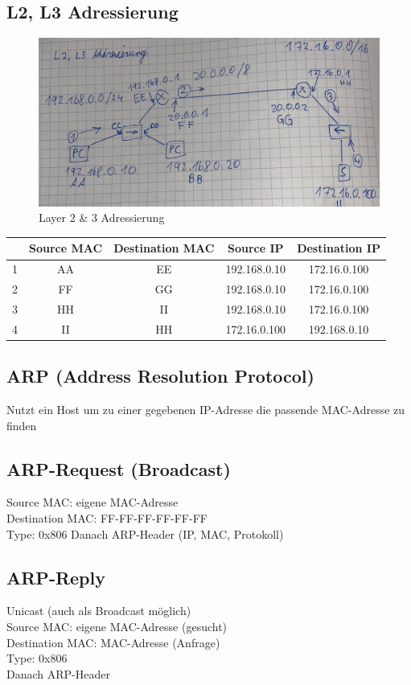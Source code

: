 \subsection*{L2, L3 Adressierung}
\begin{figure}[H]
	\centering
	\includegraphics[width=1.0\linewidth]{figures/l2l3add.jpeg}
	\caption{Layer 2 \& 3 Adressierung}
\end{figure}

\begin{table}[H]
	\begin{tabular}{c|cccc}
		& Source MAC & Destination MAC & Source IP & Destination IP \\
		\hline
		1 & AA & EE & 192.168.0.10 & 172.16.0.100 \\
		2 & FF & GG & 192.168.0.10 & 172.16.0.100 \\
		3 & HH & II & 192.168.0.10 & 172.16.0.100 \\
		4 & II & HH & 172.16.0.100 & 192.168.0.10
	\end{tabular}
\end{table}

\subsection*{ARP (Address Resolution Protocol)}
Nutzt ein Host um zu einer gegebenen IP-Adresse die passende MAC-Adresse zu finden

\subsection*{ARP-Request (Broadcast)}
Source MAC: eigene MAC-Adresse \\
Destination MAC: FF-FF-FF-FF-FF-FF \\
Type: 0x806
Danach ARP-Header (IP, MAC, Protokoll)

\subsection*{ARP-Reply}
Unicast (auch als Broadcast möglich) \\
Source MAC: eigene MAC-Adresse (gesucht) \\
Destination MAC: MAC-Adresse (Anfrage) \\
Type: 0x806 \\
Danach ARP-Header

